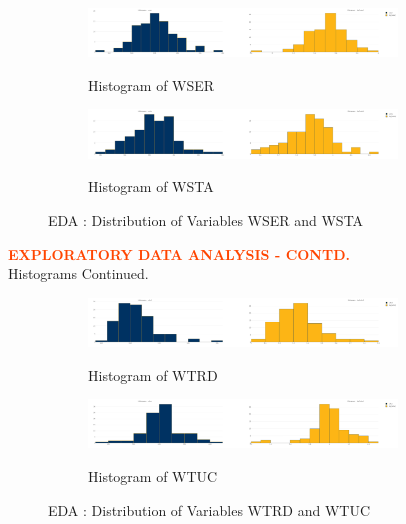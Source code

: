 \begin{figure}[!ht]
	\begin{subfigure}[b]{1.0\textwidth}
		\centering
		\includegraphics[width=0.9\textwidth,height=0.30\textheight]{images/EDA_histograms_wser.jpg}
		\label{fig:EDA Histogram WSER}
		\caption{Histogram of WSER}
	\end{subfigure}\vspace{3mm}%
	
	\begin{subfigure}[b]{1.0\textwidth}
		\centering
		\includegraphics[width=0.9\textwidth,height=0.30\textheight]{images/EDA_histograms_wsta.jpg}
		\label{fig:EDA Histogram WSTA}
		\caption{Histogram of WSTA}
	\end{subfigure}
	\label{fig:WSER and WSTA Histogram}
	\caption{EDA : Distribution of Variables WSER and WSTA}
\end{figure}

\pagebreak

\textbf{\textcolor{OrangeRed}{EXPLORATORY DATA ANALYSIS - CONTD.}}\\

Histograms Continued.\\

\begin{figure}[!ht]
	\begin{subfigure}[b]{1.0\textwidth}
		\centering
		\includegraphics[width=0.9\textwidth,height=0.30\textheight]{images/EDA_histograms_wtrd.jpg}
		\label{fig:EDA Histogram WTRD}
		\caption{Histogram of WTRD}
	\end{subfigure}\vspace{3mm}%
	
	\begin{subfigure}[b]{1.0\textwidth}
		\centering
		\includegraphics[width=0.9\textwidth,height=0.30\textheight]{images/EDA_histograms_wtuc.jpg}
		\label{fig:EDA Histogram WTUC}
		\caption{Histogram of WTUC}
	\end{subfigure}
	\label{fig:WTRD and WTUC Histogram}
	\caption{EDA : Distribution of Variables WTRD and WTUC}
\end{figure}

